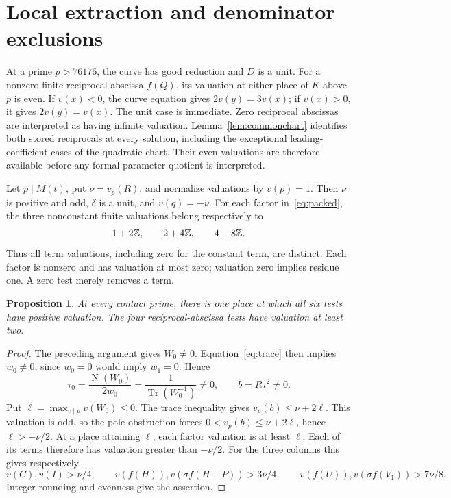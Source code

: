 \documentclass[11pt,a4paper]{article}
\newtheorem{proposition}[theorem]{Proposition}
\DeclareMathOperator{\Tr}{Tr}\DeclareMathOperator{\Nm}{N}
\begin{document}
\section{Local extraction and denominator exclusions}

At a prime $p>76176$, the curve has good reduction and $D$ is a unit.
For a nonzero finite reciprocal abscissa $f(Q)$, its valuation at
either place of $K$ above $p$ is even. If $v(x)<0$, the curve equation
gives $2v(y)=3v(x)$; if $v(x)>0$, it gives $2v(y)=v(x)$.
The unit case is immediate. Zero reciprocal abscissas are interpreted
as having infinite valuation.
Lemma~\ref{lem:commonchart} identifies both stored reciprocals at every
solution, including the exceptional leading-coefficient cases of the
quadratic chart. Their even valuations are therefore available before
any formal-parameter quotient is interpreted.

Let $p\mid M(t)$, put $\nu=v_p(R)$, and normalize valuations by
$v(p)=1$. Then $\nu$ is positive and odd, $\delta$ is a unit, and
$v(q)=-\nu$. For each factor in~\eqref{eq:packed}, the three
nonconstant finite valuations belong respectively to
\[
                     1+2\mathbb Z,\qquad 2+4\mathbb Z,\qquad4+8\mathbb Z.
\]
Thus all term valuations, including zero for the constant term, are
distinct. Each factor is nonzero and has valuation at most zero;
valuation zero implies residue one. A zero test merely removes a term.

\begin{proposition}\label{prop:local}
At every contact prime, there is one place at which all six tests have
positive valuation. The four reciprocal-abscissa tests have valuation
at least two.
\end{proposition}
\begin{proof}
The preceding argument gives $W_0\ne0$. Equation~\eqref{eq:trace} then
implies $w_0\ne0$, since $w_0=0$ would imply $w_1=0$. Hence
\[
 \tau_0=\frac{\Nm(W_0)}{2w_0}=\frac1{\Tr(W_0^{-1})}\ne0,
 \qquad b=R\tau_0^2\ne0.
\]
Put $\ell=\max_{v\mid p}v(W_0)\le0$. The trace inequality gives
$v_p(b)\le\nu+2\ell$. This valuation is odd, so the pole obstruction
forces $0<v_p(b)\le\nu+2\ell$, hence $\ell>-\nu/2$.
At a place attaining $\ell$, each factor valuation is at least $\ell$.
Each of its terms therefore has valuation greater than $-\nu/2$.
For the three columns this gives respectively
\[
 v(C),v(I)>\nu/4,\qquad
 v(f(H)),v(\sigma f(H-P))>3\nu/4,\qquad
 v(f(U)),v(\sigma f(V_1))>7\nu/8.
\]
Integer rounding and evenness give the assertion.
\end{proof}
\end{document}
